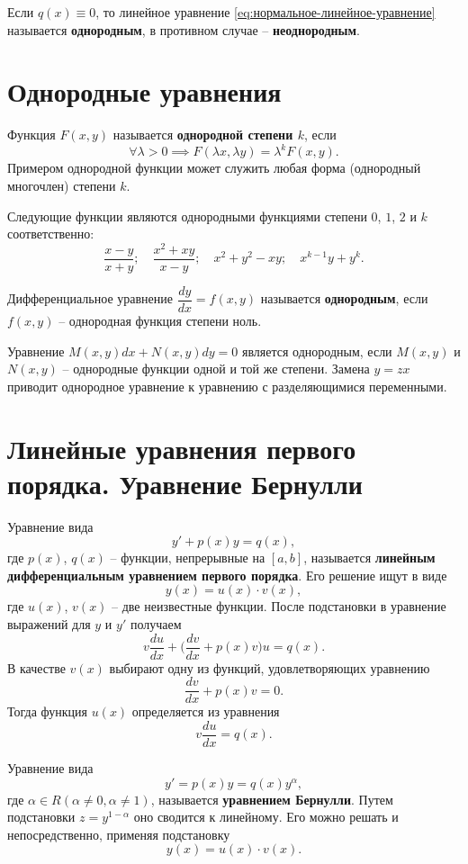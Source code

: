 \documentclass[a5paper, 11pt]{extbook}
\theoremstyle{definition}
\theoremstyle{definition}
\begin{document}
Если \(q(x) \equiv 0\), то линейное уравнение \eqref{eq:нормальное-линейное-уравнение} называется \textbf{однородным}, в противном случае -- \textbf{неоднородным}.

\section{Однородные уравнения}

Функция \(F(x, y)\) называется \textbf{однородной степени \(k\)}, если
\[
    \forall \lambda > 0 \implies F(\lambda x, \lambda y) = \lambda^k F(x, y).
\]
Примером однородной функции может служить любая форма (однородный многочлен) степени \(k\).

Следующие функции являются однородными функциями степени \(0\), \(1\), \(2\) и \(k\) соответственно:
\[
    \frac{x - y}{x + y};
    \quad
    \frac{x^2 + xy}{x - y};
    \quad
    x^2 + y^2 - xy;
    \quad
    x^{k - 1}y + y^k.
\]

Дифференциальное уравнение \(\dfrac{dy}{dx} = f(x, y)\) называется \textbf{однородным}, если \(f(x, y)\) -- однородная функция степени ноль.

Уравнение \(M(x, y)dx + N(x, y)dy = 0\) является однородным, если \(M(x, y)\) и \(N(x, y)\) -- однородные функции одной и той же степени. Замена \(y = zx\) приводит однородное уравнение к уравнению с разделяющимися переменными.

\section{Линейные уравнения первого порядка. Уравнение Бернулли}

Уравнение вида
\[
    y' + p(x)y = q(x),
\]
где \(p(x)\), \(q(x)\) -- функции, непрерывные на \([a, b]\), называется \textbf{линейным дифференциальным уравнением первого порядка}. Его решение ищут в виде
\[
    y(x) = u(x) \cdot v(x),
\]
где \(u(x)\), \(v(x)\) -- две неизвестные функции. После подстановки в уравнение выражений для \(y\) и \(y'\) получаем
\[
    v \frac{du}{dx} + \Big( \frac{dv}{dx} + p(x)v \Big) u = q(x).
\]
В качестве \(v(x)\) выбирают одну из функций, удовлетворяющих уравнению
\[
    \frac{dv}{dx} + p(x)v = 0.
\]
Тогда функция \(u(x)\) определяется из уравнения
\[
    v \frac{du}{dx} = q(x).
\]

Уравнение вида
\[
    y' = p(x)y = q(x)y^\alpha,
\]
где \(\alpha \in R (\alpha \neq 0, \alpha \neq 1)\), называется \textbf{уравнением Бернулли}. Путем подстановки \(z = y^{1 - \alpha}\) оно сводится к линейному. Его можно решать и непосредственно, применяя подстановку
\[
    y(x) = u(x) \cdot v(x).
\]
\end{document}
